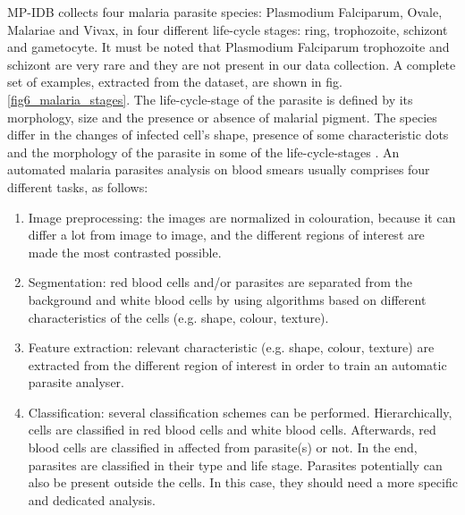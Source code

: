 \documentclass[final,a4paper,12pt,english]{UnicaPhdThesis3}
\begin{document}
MP-IDB collects four malaria parasite species: Plasmodium Falciparum, Ovale, Malariae and Vivax, in four different life-cycle stages: ring, trophozoite, schizont and gametocyte. It must be noted that Plasmodium Falciparum trophozoite and schizont are very rare and they are not present in our data collection. A complete set of examples, extracted from the dataset, are shown in fig. \ref{fig6_malaria_stages}. The life-cycle-stage of the parasite is defined by its morphology, size and the presence or absence of malarial pigment. The species differ in the changes of infected cell’s shape, presence of some characteristic dots and the morphology of the parasite in some of the life-cycle-stages \cite{Somasekar2011}.
An automated malaria parasites analysis on blood smears usually comprises four different tasks, as follows:
\begin{enumerate}  
	\item Image preprocessing: the images are normalized in colouration, because it can differ a lot from image to image, and the different regions of interest are made the most contrasted possible. 
	\item Segmentation: red blood cells and/or parasites are separated from the background and white blood cells by using algorithms based on different characteristics of the cells (e.g. shape, colour, texture).
	\item Feature extraction: relevant characteristic (e.g. shape, colour, texture) are extracted from the different region of interest in order to train an automatic parasite analyser.
	\item Classification: several classification schemes can be performed. Hierarchically, cells are classified in red blood cells and white blood cells. Afterwards, red blood cells are classified in affected from parasite(s) or not. In the end, parasites are classified in their type and life stage. Parasites potentially can also be present outside the cells. In this case, they should need a more specific and dedicated analysis.
\end{enumerate}
\end{document}

